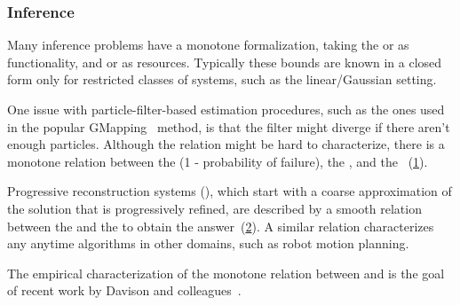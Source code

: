 \subsubsection{Inference}

Many inference problems have a monotone formalization, taking the
 or  as functionality, and 
or  as resources.
Typically these bounds are known in a closed form only for restricted classes of systems, such as the linear/Gaussian setting.

\begin{example}[SLAM]
    One issue with particle-filter-based estimation procedures, such as the ones used in the popular GMapping~\cite{grisetti07improved}
    method, is that the filter might diverge if there aren't enough particles.
    Although the relation might be hard to characterize, there is a monotone relation between the  (1 - probability of failure), the , and the ~(\cref{fig:gmapping}).
\end{example}
\begin{figure}[h]
    \centering
    \caption{}
    \label{fig:gmapping}
\end{figure}



\begin{example}
    Progressive reconstruction systems (\cite{locher16progressive}), which start with a coarse approximation of the solution that is progressively refined, are described by a smooth relation between the  and the  to obtain the answer~(\cref{fig:progressive}).
    A similar relation characterizes any anytime algorithms in other domains, such as robot motion planning.
\end{example}

\begin{figure}[h]
    \centering
    \caption{}
    \label{fig:progressive}
\end{figure}


\begin{example}
    The empirical characterization of the monotone relation between  and  is the goal of recent work by Davison and colleagues~\cite{nardi15introducing,zia16comparative}.
\end{example}

